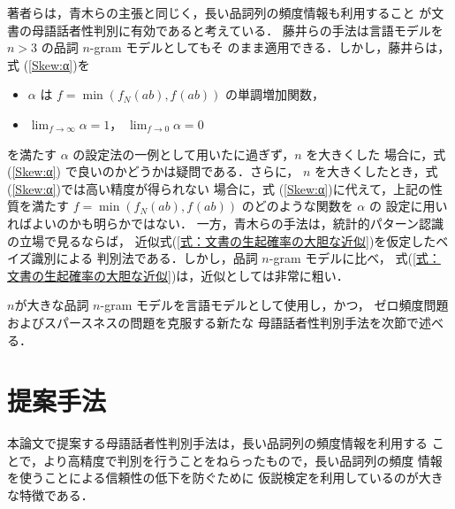 \documentclass[japanese]{jnlp_1.4}
\newcommand{\NN}{}
\begin{document}
著者らは，青木らの主張と同じく，長い品詞列の頻度情報も利用すること
が文書の母語話者性判別に有効であると考えている．
藤井らの手法は言語モデルを $n>3$ の品詞 $n$-gram モデルとしてもそ
のまま適用できる．しかし，藤井らは，式 (\ref{Skew:α})を
\begin{itemize}
\item $\alpha$ は $f=\min(f_N(ab),f_{\NN}(ab))$ の単調増加関数，
\item $\lim_{f\rightarrow\infty} \alpha =1$，
      $\lim_{f\rightarrow 0} \alpha =0$
\end{itemize}
を満たす $\alpha$ の設定法の一例として用いたに過ぎず，$n$ を大きくした
場合に，式 (\ref{Skew:α}) で良いのかどうかは疑問である．さらに，
$n$ を大きくしたとき，式 (\ref{Skew:α})では高い精度が得られない
場合に，式 (\ref{Skew:α})に代えて，上記の性質を満たす
$f=\min(f_N(ab),f_{\NN}(ab))$ のどのような関数を $\alpha$ の
設定に用いればよいのかも明らかではない．
一方，青木らの手法は，統計的パターン認識の立場で見るならば，
近似式(\ref{式：文書の生起確率の大胆な近似})を仮定したベイズ識別による
判別法である．しかし，品詞 $n$-gram モデルに比べ，
式(\ref{式：文書の生起確率の大胆な近似})は，近似としては非常に粗い．

$n$が大きな品詞 $n$-gram モデルを言語モデルとして使用し，かつ，
ゼロ頻度問題およびスパースネスの問題を克服する新たな
母語話者性判別手法を次節で述べる．


\section{提案手法}

本論文で提案する母語話者性判別手法は，長い品詞列の頻度情報を利用する
ことで，より高精度で判別を行うことをねらったもので，長い品詞列の頻度
情報を使うことによる信頼性の低下を防ぐために
仮説検定を利用しているのが大きな特徴である．
\end{document}
